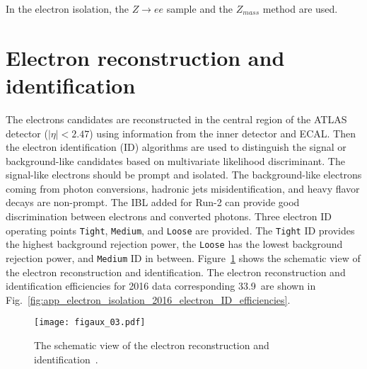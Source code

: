 In the electron isolation, the $Z \to ee$ sample and the $Z_{mass}$ method are used.


\section{Electron reconstruction and identification}
\label{sec:app_electron_reconstruction_and_identification}
The electrons candidates are reconstructed in the central region of the ATLAS detector ($|\eta| < 2.47$) using information from the inner detector and ECAL.
Then the electron identification (ID) algorithms are used to distinguish the signal or background-like candidates based on multivariate likelihood discriminant.
The signal-like electrons should be prompt and isolated.
The background-like electrons coming from photon conversions, hadronic jets misidentification, and heavy flavor decays are non-prompt.
The IBL added for Run-2 can provide good discrimination between electrons and converted photons.
Three electron ID operating points \texttt{Tight}, \texttt{Medium}, and \texttt{Loose} are provided.
The \texttt{Tight} ID provides the highest background rejection power, the \texttt{Loose} has the lowest background rejection power, and \texttt{Medium} ID in between.
Figure~\ref{fig:app_electron_isolation_schematic_view_of_electron_reco_ID} shows the schematic view of the electron reconstruction and identification.
The electron reconstruction and identification efficiencies for 2016 data corresponding 33.9~\ifb are shown in Fig.~\ref{fig:app_electron_isolation_2016_electron_ID_efficiencies}.

\begin{figure}[htbp]
    \begin{center}
        \texttt{[image: figaux\_03.pdf]}
        \caption{The schematic view of the electron reconstruction and identification~\cite{ATLAS:2016iqc}.}
        \label{fig:app_electron_isolation_schematic_view_of_electron_reco_ID}
    \end{center}
\end{figure}

